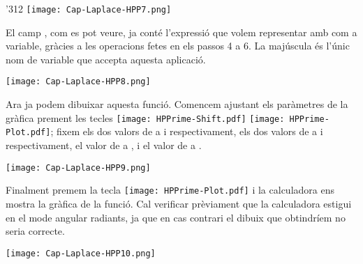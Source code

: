 \begin{exemple}
\begin{dingautolist}{'312}
            \texttt{[image: Cap-Laplace-HPP7.png]}\vspace{5mm}

          \item El camp  , com es pot veure, ja conté l'expressió que volem representar amb   com a variable, gràcies a les operacions fetes en els passos 4 a 6. La  majúscula és l'únic nom de variable que accepta aquesta aplicació.

            \texttt{[image: Cap-Laplace-HPP8.png]}\vspace{5mm}

          \item Ara ja podem dibuixar aquesta funció. Comencem ajustant els paràmetres de la gràfica prement les tecles \texttt{[image: HPPrime-Shift.pdf]} \texttt{[image: HPPrime-Plot.pdf]}; fixem els dos valors de  a  i  respectivament, els dos valors de  a  i  respectivament, el valor de  a , i el valor de  a .

            \texttt{[image: Cap-Laplace-HPP9.png]}\vspace{5mm}

          \item Finalment premem la tecla \texttt{[image: HPPrime-Plot.pdf]} i la calculadora ens mostra la gràfica de la funció. Cal verificar prèviament que la calculadora estigui en el mode angular radiants, ja que en cas contrari el dibuix que obtindríem no seria correcte.

            \texttt{[image: Cap-Laplace-HPP10.png]}

    \end{dingautolist}

\end{exemple}
